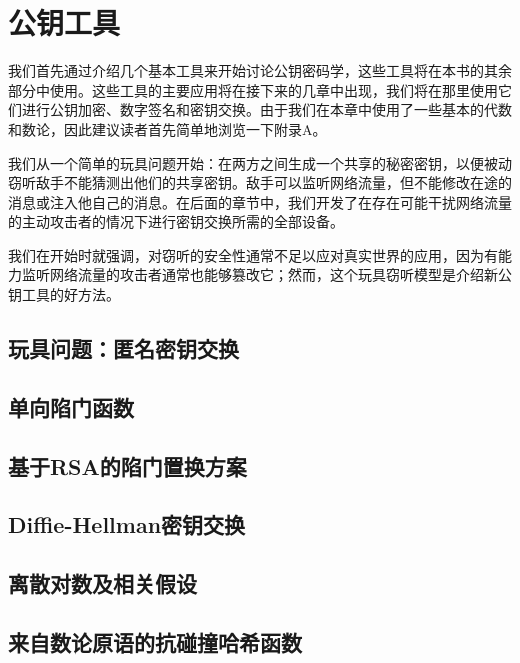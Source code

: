 \chapter{公钥工具}\label{chp:10IOP}
我们首先通过介绍几个基本工具来开始讨论公钥密码学，这些工具将在本书的其余部分中使用。这些工具的主要应用将在接下来的几章中出现，我们将在那里使用它们进行公钥加密、数字签名和密钥交换。由于我们在本章中使用了一些基本的代数和数论，因此建议读者首先简单地浏览一下附录A。

我们从一个简单的玩具问题开始：在两方之间生成一个共享的秘密密钥，以便被动窃听敌手不能猜测出他们的共享密钥。敌手可以监听网络流量，但不能修改在途的消息或注入他自己的消息。在后面的章节中，我们开发了在存在可能干扰网络流量的主动攻击者的情况下进行密钥交换所需的全部设备。

我们在开始时就强调，对窃听的安全性通常不足以应对真实世界的应用，因为有能力监听网络流量的攻击者通常也能够篡改它；然而，这个玩具窃听模型是介绍新公钥工具的好方法。

\section{玩具问题：匿名密钥交换}\label{10.1}
\section{单向陷门函数}\label{10.2}
\section{基于RSA的陷门置换方案}\label{10.3}
\section{Diffie-Hellman密钥交换}\label{10.4}
\section{离散对数及相关假设}\label{10.5}
\section{来自数论原语的抗碰撞哈希函数}\label{10.6}
